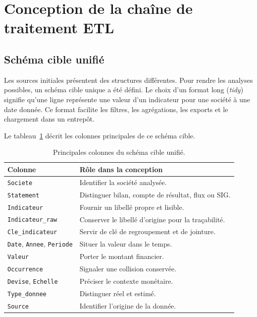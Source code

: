 \section{Conception de la chaîne de traitement ETL}
\label{sec:etl}
\subsection{Schéma cible unifié}
\par Les sources initiales présentent des structures différentes. Pour rendre
les analyses possibles, un schéma cible unique a été défini. Le choix d'un
format long (\textit{tidy}) signifie qu'une ligne représente une valeur d'un
indicateur pour une société à une date donnée. Ce format facilite les filtres,
les agrégations, les exports et le chargement dans un entrepôt.

\par Le tableau~\ref{tab:schemaunifie} décrit les colonnes principales de ce
schéma cible.

\begin{table}[H]
\centering
\caption[Schéma cible unifié]{Principales colonnes du schéma cible unifié.}
\label{tab:schemaunifie}
\begin{tabularx}{\linewidth}{|p{3.4cm}|X|}
\hline
\textbf{Colonne} & \textbf{Rôle dans la conception} \\ \hline
\texttt{Societe} & Identifier la société analysée. \\ \hline
\texttt{Statement} & Distinguer bilan, compte de résultat, flux ou SIG. \\ \hline
\texttt{Indicateur} & Fournir un libellé propre et lisible. \\ \hline
\texttt{Indicateur\_raw} & Conserver le libellé d'origine pour la traçabilité. \\ \hline
\texttt{Cle\_indicateur} & Servir de clé de regroupement et de jointure. \\ \hline
\texttt{Date}, \texttt{Annee}, \texttt{Periode} & Situer la valeur dans le temps. \\ \hline
\texttt{Valeur} & Porter le montant financier. \\ \hline
\texttt{Occurrence} & Signaler une collision conservée. \\ \hline
\texttt{Devise}, \texttt{Echelle} & Préciser le contexte monétaire. \\ \hline
\texttt{Type\_donnee} & Distinguer réel et estimé. \\ \hline
\texttt{Source} & Identifier l'origine de la donnée. \\ \hline
\end{tabularx}
\end{table}

